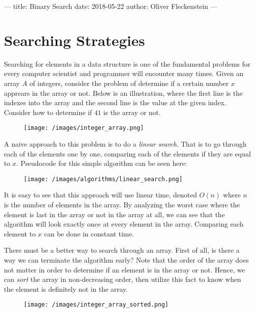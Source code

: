 ---
title: Binary Search
date: 2018-05-22
author: Oliver Fleckenstein
---
\section{Searching Strategies}

    Searching for elements in a data structure is one of the fundamental problems for every computer scientist and programmer will encounter many times.
    Given an array $A$ of integers, consider the problem of determine if a certain number $x$ apprears in the array or not.
    Below is an illustration, where the first line is the indexes into the array and the second line is the value at the given index.
    Consider how to determine if $41$ is the array or not.

    \begin{figure}[!h]
        \centering
        \texttt{[image: /images/integer\_array.png]}
    \end{figure}

    A naive approach to this problem is to do a \emph{linear search}.
    That is to go through each of the elements one by one, comparing each of the elements if they are equal to $x$.
    Pseudocode for this simple algorithm can be seen here:

    \begin{figure}[!h]
        \centering
        \texttt{[image: /images/algorithms/linear\_search.png]}
    \end{figure}

    It is easy to see that this approach will use linear time, denoted $O(n)$ where $n$ is the number of elements in the array.
    By analyzing the worst case where the element is last in the array or not in the array at all, we can see that the algorithm will look exactly once at every element in the array.
    Comparing each element to $x$ can be done in constant time.

    There must be a better way to search through an array.
    First of all, is there a way we can terminate the algorithm early?
    Note that the order of the array does not matter in order to determine if an element is in the array or not.
    Hence, we can \emph{sort} the array in non-decreasing order, then utilize this fact to know when the element is definitely not in the array.

    \begin{figure}[!h]
        \centering
        \texttt{[image: /images/integer\_array\_sorted.png]}
    \end{figure}

